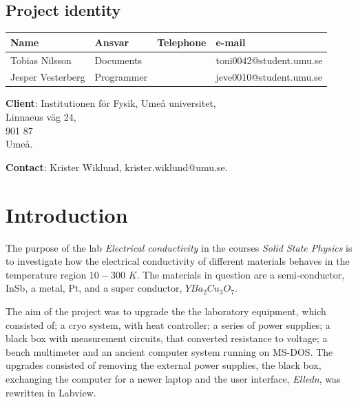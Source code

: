 \documentclass[a4paper,12pt]{article}
\begin{document}
\pagestyle{fancy}
\headheight 35pt 
\rhead{\small\today \\ }
\chead{\projektnamn}
\lhead{\organisation \\ }
\cfoot{\thepage}
\rfoot{\projektgrupp}
\begin{center}

\section*{\center Project identity}

\bigskip
\begin{tabular}{|p{35mm}|p{30mm}|p{20mm}|p{45mm}|}
\hline
\textbf{Name} & \textbf{Ansvar} & \textbf{Telephone} & \textbf{e-mail}\\
\hline
Tobias Nilsson & Documents &  & toni0042@student.umu.se\\
\hline
Jesper Vesterberg & Programmer &  & jeve0010@student.umu.se\\
\hline
\end{tabular}

\bigskip
\textbf{Client}: Institutionen för Fysik, Umeå universitet, \\
Linnaeus väg 24,\\
901 87\\
Umeå.

\textbf{Contact}: Krister Wiklund, krister.wiklund@umu.se.
\end{center}
\newpage

\tableofcontents
\newpage
{}

\section{Introduction}
The purpose of the lab \emph{Electrical conductivity} in the courses \emph{Solid State Physics} is to investigate how the electrical conductivity of different materials behaves in the temperature region $10-300$ $K$. The materials in question are a semi-conductor, InSb, a metal, Pt, and a super conductor, $YBa_2Cu_3O_7$.

The aim of the project was to upgrade the the laboratory equipment, which consisted of; a cryo system, with heat controller; a series of power supplies; a black box with measurement circuits, that converted resistance to voltage; a bench multimeter and an ancient  computer system running on MS-DOS. The upgrades consisted of removing the external power supplies, the black box, exchanging the computer for a newer laptop and the user interface, \emph{Elledn}, was rewritten in Labview.
\end{document}
